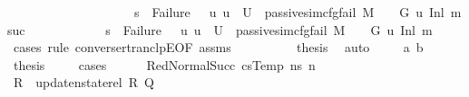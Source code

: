 \begin{isabellebody}
\ \ \ \ \ \ \ \ \ \ \ \ \ \ \ \ \ \ \ \ s{\isacharprime}{\kern0pt}\ {\isacharequal}{\kern0pt}\ Failure\ {\isasymlongrightarrow}\ {\isacharparenleft}{\kern0pt}{\isasymexists}\ u{\isachardot}{\kern0pt}\ u\ {\isasymin}\ U{}\ {\isasymand}\ passive{\isacharunderscore}{\kern0pt}sim{\isacharunderscore}{\kern0pt}cfg{\isacharunderscore}{\kern0pt}fail\ M\ {\isasymLambda}{}\ {\isasymGamma}\ {\isasymOmega}\ G{}\ u\ {\isacharparenleft}{\kern0pt}Inl\ msuc{\isacharparenright}{\kern0pt}{\isacharparenright}{\kern0pt}{\isachardoublequoteclose}\isanewline
\ \ \ \ \ \ \ \ \ \ \ \ {\isachardoublequoteopen}s{\isacharprime}{\kern0pt}\ {\isacharequal}{\kern0pt}\ Failure\ {\isasymlongrightarrow}\ {\isacharparenleft}{\kern0pt}{\isasymexists}\ u{\isachardot}{\kern0pt}\ u\ {\isasymin}\ U{}\ {\isasymand}\ passive{\isacharunderscore}{\kern0pt}sim{\isacharunderscore}{\kern0pt}cfg{\isacharunderscore}{\kern0pt}fail\ M\ {\isasymLambda}{}\ {\isasymGamma}\ {\isasymOmega}\ G{}\ u\ {\isacharparenleft}{\kern0pt}Inl\ m{\isacharparenright}{\kern0pt}{\isacharparenright}{\kern0pt}{\isachardoublequoteclose}\isanewline
%
\isadelimproof
%
\endisadelimproof
%
\isatagproof
{}\isamarkupfalse%
\ {\isacharparenleft}{\kern0pt}cases\ rule{\isacharcolon}{\kern0pt}\ converse{\isacharunderscore}{\kern0pt}rtranclpE{}{\isacharbrackleft}{\kern0pt}OF\ assms{\isacharparenleft}{\kern0pt}{}{\isacharparenright}{\kern0pt}{\isacharbrackright}{\kern0pt}{\isacharparenright}{\kern0pt}\isanewline
\ \ \isamarkupfalse%
\ {}\isanewline
\ \ \isamarkupfalse%
\ \isamarkupfalse%
\ {\isacharquery}{\kern0pt}thesis\ \isamarkupfalse%
\ auto\isanewline
{}\isamarkupfalse%
\isanewline
\ \ \isamarkupfalse%
\ {\isacharparenleft}{\kern0pt}{}\ a\ b{\isacharparenright}{\kern0pt}\isanewline
\ \ \isamarkupfalse%
\ \isamarkupfalse%
\ {\isacharquery}{\kern0pt}thesis\ \isanewline
\ \ \isamarkupfalse%
\ cases\isanewline
\ \ \ \ \isamarkupfalse%
\ {\isacharparenleft}{\kern0pt}RedNormalSucc\ csTemp\ ns{\isacharprime}{\kern0pt}\ n{\isacharprime}{\kern0pt}{\isacharparenright}{\kern0pt}\isanewline
\ \ \ \ \ \isamarkupfalse%
\ {\isacharquery}{\kern0pt}R{\isacharprime}{\kern0pt}\ {\isacharequal}{\kern0pt}\ {\isachardoublequoteopen}update{\isacharunderscore}{\kern0pt}nstate{\isacharunderscore}{\kern0pt}rel\ R\ Q{\isachardoublequoteclose}\isanewline

\end{isabellebody}
